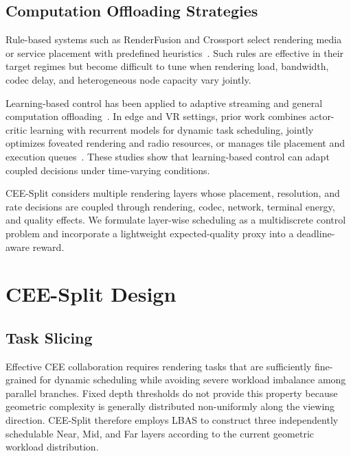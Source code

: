 \documentclass[acmsmall]{acmart}
\begin{document}
\subsection{Computation Offloading Strategies}

Rule-based systems such as RenderFusion and Crossport select rendering media or service placement with predefined heuristics~\cite{lu_renderfusion_2023,su_crossport_2026}. Such rules are effective in their target regimes but become difficult to tune when rendering load, bandwidth, codec delay, and heterogeneous node capacity vary jointly.

Learning-based control has been applied to adaptive streaming and general computation offloading~\cite{schulman_proximal_2017,mao_neural_2017,huang_deep_2020,tang_deep_2025,yang_dqn_2022}. In edge and VR settings, prior work combines actor-critic learning with recurrent models for dynamic task scheduling, jointly optimizes foveated rendering and radio resources, or manages tile placement and execution queues~\cite{tuli_dynamic_2022,nyamtiga_adaptive_2024,xu_wireless_2025,saha_deep_2026}. These studies show that learning-based control can adapt coupled decisions under time-varying conditions.

CEE-Split considers multiple rendering layers whose placement, resolution, and rate decisions are coupled through rendering, codec, network, terminal energy, and quality effects. We formulate layer-wise scheduling as a multidiscrete control problem and incorporate a lightweight expected-quality proxy into a deadline-aware reward.

	
	
\section{CEE-Split Design}

\subsection{Task Slicing}

Effective CEE collaboration requires rendering tasks that are sufficiently fine-grained for dynamic scheduling while avoiding severe workload imbalance among parallel branches. Fixed depth thresholds do not provide this property because geometric complexity is generally distributed non-uniformly along the viewing direction. CEE-Split therefore employs LBAS to construct three independently schedulable Near, Mid, and Far layers according to the current geometric workload distribution.
\end{document}
